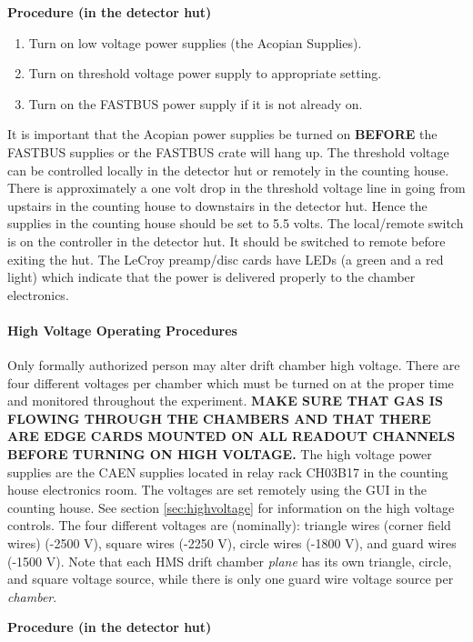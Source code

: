 \begin{center}
{\bf Procedure (in the detector hut)}
\end{center}

\begin{enumerate}
\item {Turn on low voltage power supplies (the Acopian Supplies).}
\item {Turn on threshold voltage power supply to appropriate setting.}
\item {Turn on the FASTBUS power supply if it is not already on.}
\end{enumerate}

It is important that the Acopian power supplies be turned on {\bf BEFORE} the
FASTBUS supplies or the FASTBUS crate will hang up.  The threshold voltage
can be controlled locally in the detector hut or remotely in the
counting house. There is approximately a one volt drop in the threshold
voltage line in going from upstairs in the counting house to
downstairs in the detector hut.  Hence the supplies in the counting
house should be set to 5.5 volts. The local/remote switch is on the
controller in the
detector hut.  It should be switched to remote before exiting the hut.  The
LeCroy preamp/disc cards have LEDs (a green and a red light) which indicate
that the power is delivered properly to the chamber electronics.

\paragraph{High Voltage Operating Procedures}

Only formally authorized person may alter drift chamber high voltage.
There are four different voltages per chamber which must be turned on at the
proper time and monitored throughout the experiment.  {\bf MAKE SURE THAT
GAS IS FLOWING THROUGH THE CHAMBERS AND THAT THERE ARE 
EDGE 
CARDS MOUNTED
ON ALL READOUT CHANNELS BEFORE TURNING ON HIGH VOLTAGE.}  
The high voltage
power supplies are the CAEN supplies located in relay rack CH03B17 in
the counting house electronics room.  The
voltages are set remotely using the GUI in the counting
house. See section \ref{sec:highvoltage} for information on
the high voltage controls.
The four different voltages are (nominally): triangle
wires (corner field wires) (-2500 V),
square wires (-2250 V), circle wires (-1800 V), and guard wires (-1500 V).
Note that each HMS drift chamber {\em plane} has its own triangle, circle,
and square voltage source, while there is only one guard wire voltage
source per {\em chamber}.
\begin{center}
{\bf Procedure (in the detector hut)}
\end{center}

